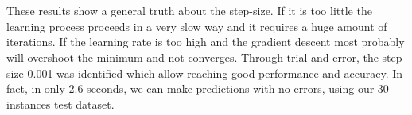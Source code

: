 \documentclass[a4paper,11pt,oneside]{book}
\begin{document}
\\ \\
These results show a general truth about the step-size. If it is too little the learning process proceeds in a very slow way and it requires a huge amount of iterations. If the learning rate is too high and the gradient descent most probably will overshoot the minimum and not converges. Through trial and error, the step-size 0.001 was identified which allow reaching good performance and accuracy. In fact, in only 2.6 seconds, we can make predictions with no errors, using our 30 instances test dataset.
\end{document}
